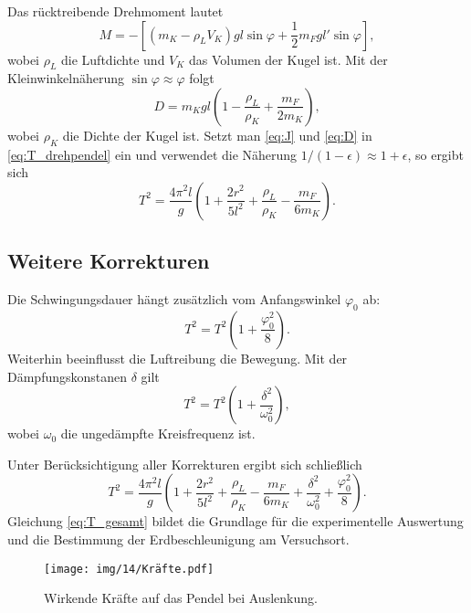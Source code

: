 Das rücktreibende Drehmoment lautet
\begin{equation}
    M = -\left[\left(m_K - \rho_L V_K \right) g l \sin \varphi + \frac{1}{2} m_F g l' \sin \varphi \right],
    \label{eq:drehmoment}
\end{equation}
wobei $\rho_L$ die Luftdichte und $V_K$ das Volumen der Kugel ist. Mit der Kleinwinkelnäherung $\sin\varphi \approx \varphi$ folgt
\begin{equation}
    D = m_K g l \left(1 - \frac{\rho_L}{\rho_K} + \frac{m_F}{2 m_K}\right),
    \label{eq:D}
\end{equation}
wobei $\rho_K$ die Dichte der Kugel ist. Setzt man \eqref{eq:J} und \eqref{eq:D} in \eqref{eq:T_drehpendel} ein und verwendet die Näherung $1/(1-\epsilon) \approx 1+\epsilon$, so ergibt sich
\begin{equation}
    T^2 = \frac{4 \pi^2 l}{g} \left(1 + \frac{2r^2}{5l^2} + \frac{\rho_L}{\rho_K} - \frac{m_F}{6m_K}\right).
    \label{eq:T_korr1}
\end{equation}

\subsection{Weitere Korrekturen}
Die Schwingungsdauer hängt zusätzlich vom Anfangswinkel $\varphi_0$ ab:
\begin{equation}
    T^2 = T^2 \left(1 + \frac{\varphi_0^2}{8}\right).
    \label{eq:T_winkel}
\end{equation}
Weiterhin beeinflusst die Luftreibung die Bewegung. Mit der Dämpfungskonstanen $\delta$ gilt
\begin{equation}
    T^2 = T^2 \left(1 + \frac{\delta^2}{\omega_0^2}\right),
    \label{eq:T_daempfung}
\end{equation}
wobei $\omega_0$ die ungedämpfte Kreisfrequenz ist.

Unter Berücksichtigung aller Korrekturen ergibt sich schließlich
\begin{equation}
    T^2 = \frac{4\pi^2 l}{g} \left(1 + \frac{2r^2}{5l^2} + \frac{\rho_L}{\rho_K} - \frac{m_F}{6 m_K} + \frac{\delta^2}{\omega_0^2} + \frac{\varphi_0^2}{8}\right).
    \label{eq:T_gesamt}
\end{equation}
Gleichung \eqref{eq:T_gesamt} bildet die Grundlage für die experimentelle Auswertung und die Bestimmung der Erdbeschleunigung am Versuchsort.


\begin{figure}
    \centering
    \texttt{[image: img/14/Kräfte.pdf]}
    \caption{Wirkende Kräfte auf das Pendel bei Auslenkung.}
\end{figure}